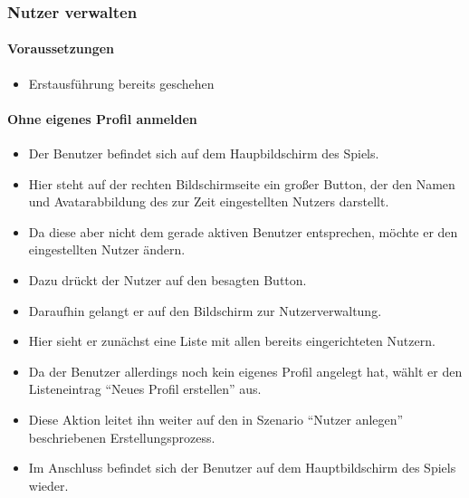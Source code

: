 \subsubsection{Nutzer verwalten}
\paragraph{Voraussetzungen}
\begin{itemize}
\item Erstausführung bereits geschehen
\end{itemize}

\paragraph{Ohne eigenes Profil anmelden}
\begin{itemize}
\item Der Benutzer befindet sich auf dem Haupbildschirm des Spiels.
\item Hier steht auf der rechten Bildschirmseite ein großer Button, 
der den Namen und Avatarabbildung des zur Zeit eingestellten Nutzers darstellt.
\item Da diese aber nicht dem gerade aktiven Benutzer entsprechen, möchte er den eingestellten Nutzer ändern.
\item Dazu drückt der Nutzer auf den besagten Button.
\item Daraufhin gelangt er auf den Bildschirm zur Nutzerverwaltung.
\item Hier sieht er zunächst eine Liste mit allen bereits 
eingerichteten Nutzern.
\item Da der Benutzer allerdings noch kein eigenes Profil
angelegt hat, wählt er den Listeneintrag "`Neues Profil erstellen"' aus.
\item Diese Aktion leitet ihn weiter auf den in Szenario "`Nutzer anlegen"'
beschriebenen Erstellungsprozess.
\item Im Anschluss befindet sich der Benutzer auf dem Hauptbildschirm des Spiels wieder.
\end{itemize}

